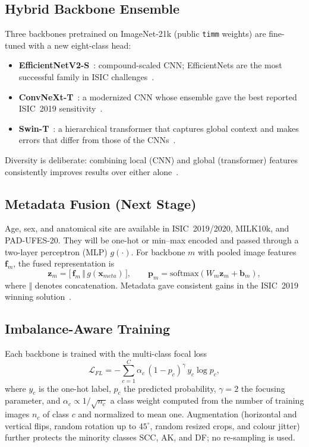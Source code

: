 \subsection{Hybrid Backbone Ensemble}\label{sec:m_backbones}
Three backbones pretrained on ImageNet-21k (public \texttt{timm}
weights) are fine-tuned with a new eight-class head:
\begin{itemize}
  \item \textbf{EfficientNetV2-S}~\cite{tan2021efficientnetv2}: compound-scaled
        CNN; EfficientNets are the most successful family in ISIC
        challenges~\cite{gessert2020,ha2020siim}.
  \item \textbf{ConvNeXt-T}~\cite{liu2022convnext}: a modernized CNN
        whose ensemble gave the best reported ISIC~2019
        sensitivity~\cite{baykal2024convnext}.
  \item \textbf{Swin-T}~\cite{liu2021swin}: a hierarchical
        transformer that captures global context and makes errors that
        differ from those of the CNNs~\cite{ayas2023swin}.
\end{itemize}
Diversity is deliberate: combining local (CNN) and global
(transformer) features consistently improves results over either
alone~\cite{nie2023hybrid,karthik2024}.

\subsection{Metadata Fusion (Next Stage)}\label{sec:m_meta}
Age, sex, and anatomical site are available in ISIC~2019/2020,
MILK10k, and PAD-UFES-20. They will be one-hot or min--max encoded and
passed through a two-layer perceptron (MLP) $g(\cdot)$. For backbone
$m$ with pooled image features $\mathbf{f}_m$, the fused representation
is
\begin{equation}
\mathbf{z}_m = \big[\,\mathbf{f}_m \,\Vert\, g(\mathbf{x}_{meta})\,\big],\qquad
\mathbf{p}_m = \mathrm{softmax}(W_m\mathbf{z}_m+\mathbf{b}_m),
\end{equation}
where $\Vert$ denotes concatenation. Metadata gave consistent gains in
the ISIC~2019 winning solution~\cite{gessert2020}.

\subsection{Imbalance-Aware Training}\label{sec:m_imb}
Each backbone is trained with the multi-class focal loss~\cite{lin2017focal}
\begin{equation}
\mathcal{L}_{FL} = -\sum_{c=1}^{C}\alpha_c\,(1-p_{c})^{\gamma}\,y_c\log p_{c},
\label{eq:focal}
\end{equation}
where $y_c$ is the one-hot label, $p_c$ the predicted probability,
$\gamma=2$ the focusing parameter, and $\alpha_c\propto 1/\sqrt{n_c}$ a
class weight computed from the number of training images $n_c$ of class
$c$ and normalized to mean one. Augmentation (horizontal and vertical
flips, random rotation up to $45^\circ$, random resized crops, and
colour jitter) further protects the minority classes SCC, AK, and DF;
no re-sampling is used.

